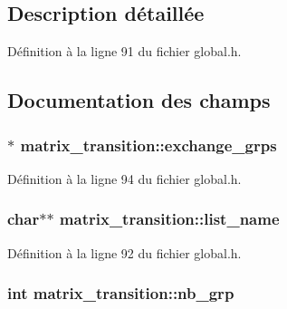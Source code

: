 \subsection{Description détaillée}


Définition à la ligne 91 du fichier global.\+h.



\subsection{Documentation des champs}
\hypertarget{structmatrix__transition_ad09abbe408a97387843ccd48e8358f7c}{
\subsubsection[{exchange\+\_\+grps}]{$\ast$ matrix\+\_\+transition\+::exchange\+\_\+grps}}\label{structmatrix__transition_ad09abbe408a97387843ccd48e8358f7c}


Définition à la ligne 94 du fichier global.\+h.

\hypertarget{structmatrix__transition_a3840718ccc94af35ad32de5a316336e7}{
\subsubsection[{list\+\_\+name}]{\setlength{\rightskip}{0pt plus 5cm}char$\ast$$\ast$ matrix\+\_\+transition\+::list\+\_\+name}}\label{structmatrix__transition_a3840718ccc94af35ad32de5a316336e7}


Définition à la ligne 92 du fichier global.\+h.

\hypertarget{structmatrix__transition_aa62d9919664f603000d1ee218fed0fa9}{
\subsubsection[{nb\+\_\+grp}]{\setlength{\rightskip}{0pt plus 5cm}int matrix\+\_\+transition\+::nb\+\_\+grp}}\label{structmatrix__transition_aa62d9919664f603000d1ee218fed0fa9}


